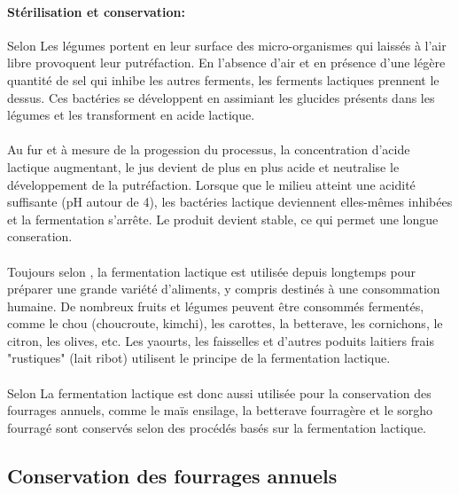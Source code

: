 \documentclass[12pt,a4paper]{report}
\begin{document}
\paragraph{Stérilisation et conservation:} Selon \cite{noauthor_fermentation_2018} Les légumes portent en leur surface des micro-organismes qui laissés à l'air libre provoquent leur putréfaction. En l'absence d'air et en présence d'une légère quantité de sel qui inhibe les autres ferments, les ferments lactiques prennent le dessus. Ces bactéries se développent en assimiant les glucides présents dans les légumes et les transforment en acide lactique. 

\paragraph{}Au fur et à mesure de la progession du processus, la concentration d'acide lactique augmentant, le jus devient de plus en plus acide et neutralise le développement de la putréfaction. Lorsque que le milieu atteint une acidité suffisante (pH autour de 4), les bactéries lactique deviennent elles-mêmes inhibées et la fermentation s'arrête. Le produit devient stable, ce qui permet une longue conseration.

\paragraph{}Toujours selon \cite{noauthor_fermentation_2018}, la fermentation lactique est utilisée depuis longtemps pour préparer une grande variété d'aliments, y compris destinés à une consommation humaine. De nombreux fruits et légumes peuvent être consommés fermentés, comme le chou (choucroute, kimchi), les carottes, la betterave, les cornichons, le citron, les olives, etc. Les yaourts, les faisselles et d'autres poduits laitiers frais "rustiques" (lait ribot) utilisent le principe de la fermentation lactique. 

\paragraph{}Selon \cite{maciejewski_productions_2015}La fermentation lactique est donc aussi utilisée pour la conservation des fourrages annuels, comme le maïs ensilage, la betterave fourragère et le sorgho fourragé sont conservés selon des procédés basés sur la fermentation lactique.

\subsection{Conservation des fourrages annuels}
\end{document}
